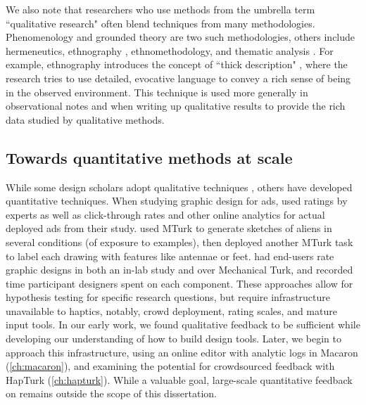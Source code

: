 We also note that researchers who use methods from the umbrella term ``qualitative research" often blend techniques from many methodologies.
Phenomenology and grounded theory are two such methodologies, others include hermeneutics, ethnography \cite{Moustakas1994}, ethnomethodology, and thematic analysis \cite{Ryan2003}.
For example, ethnography introduces the concept of ``thick description" \cite{}, where the research tries to use detailed, evocative language to convey a rich sense of being in the observed environment.
This technique is used more generally in observational notes and when writing up qualitative results to provide the rich data studied by qualitative methods.

\subsection{Towards quantitative methods at scale}
While some design scholars adopt qualitative techniques \cite{Schon1982,Cross2007,Cross2011}, others have developed quantitative techniques.
When studying graphic design for ads, \citet{Dow2011} used ratings by experts as well as click-through rates and other online analytics for actual deployed ads from their study.
\citet{Kulkarni2012} used MTurk to generate sketches of aliens in several conditions (of exposure to examples), then deployed another MTurk task to label each drawing with features like antennae or feet.
\citet{Lee2010a} had end-users rate graphic designs in both an in-lab study and over Mechanical Turk, and recorded time participant designers spent on each component.
These approaches allow for hypothesis testing for specific research questions, but require infrastructure unavailable to haptics, notably, crowd deployment, rating scales, and mature input tools.
In our early work, we found qualitative feedback to be sufficient while developing our understanding of how to build design tools.
Later, we begin to approach this infrastructure, using an online editor with analytic logs in Macaron (\autoref{ch:macaron}), and examining the potential for crowdsourced feedback with HapTurk (\autoref{ch:hapturk}).
While a valuable goal, large-scale quantitative feedback on \haxd remains outside the scope of this dissertation.




